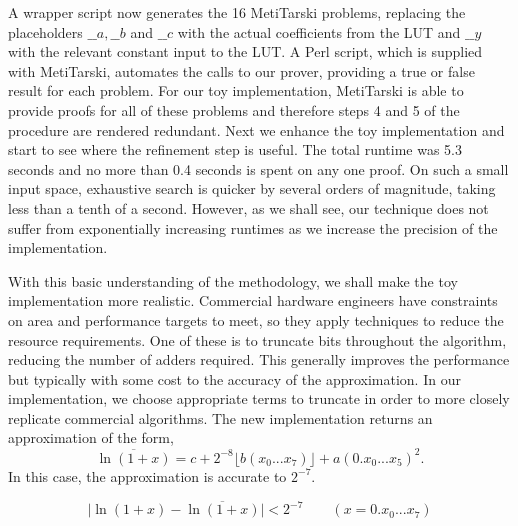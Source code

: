\documentclass{fac}
\newcommand{\abs}[1]{\lvert#1\rvert}
\begin{document}
A wrapper script now generates the 16 MetiTarski problems, replacing the placeholders $\_\_a, \_\_b$ and $\_\_c$ with the actual coefficients from the LUT and $\_\_y$ with the relevant constant input to the LUT. A Perl script, which is supplied with MetiTarski, automates the calls to our prover, providing a true or false result for each problem. For our toy implementation, MetiTarski is able to provide proofs for all of these problems and therefore steps 4 and 5 of the procedure are rendered redundant. Next we enhance the toy implementation and start to see where the refinement step is useful. The total runtime was 5.3 seconds and no more than 0.4 seconds is spent on any one proof. On such a small input space, exhaustive search is quicker by several orders of magnitude, taking less than a tenth of a second. However, as we shall see, our technique does not suffer from exponentially increasing runtimes as we increase the precision of the implementation. 

With this basic understanding of the methodology, we shall make the toy implementation more realistic. Commercial hardware engineers have constraints on area and performance targets to meet, so they apply techniques to reduce the resource requirements. One of these is to truncate bits throughout the algorithm, reducing the number of adders required. This generally improves the performance but typically with some cost to the accuracy of the approximation. In our implementation, we choose appropriate terms to truncate in order to more closely replicate commercial algorithms. The new implementation returns an approximation of the form, 
\begin{equation} \label{update_toy}
\overline{\ln(1+x)}=c + 2^{-8} \lfloor{b(x_0...x_7)} \rfloor +a(0.x_0...x_5)^2. 
\end{equation}
In this case, the approximation is accurate to $2^{-7}$.

\[ \abs{\ln(1+x)-\overline{\ln(1+x)}} <2^{-7} \qquad (x= 0.x_0...x_7) \]
\end{document}
